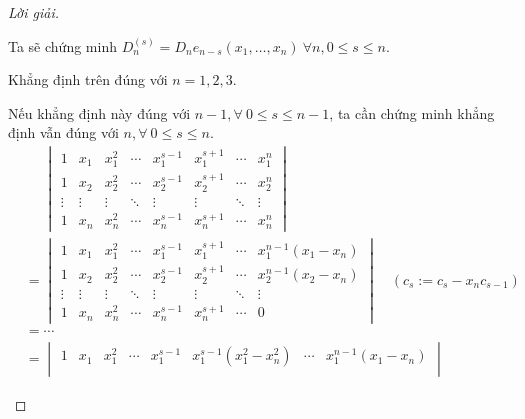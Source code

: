 \documentclass[class=linearalgebra,crop=false]{standalone}
\begin{document}
\begin{proof}[Lời giải]
\begin{enumerate}[label = (\alph*)]
              \par Ta sẽ chứng minh $D_{n}^{(s)} = D_{n}e_{n-s}(x_{1},\ldots, x_{n})\ \forall n, 0\le s\le n$.
              \par Khẳng định trên đúng với $n = 1, 2, 3$.
              \par Nếu khẳng định này đúng với $n - 1, \forall\ 0\le s\le n-1$, ta cần chứng minh khẳng định vẫn đúng với $n, \forall\ 0\le s\le n$.
              \begin{align*}
                   & \phantom{=}\begin{vmatrix}
                                    1      & x_{1}  & x_{1}^{2} & \cdots & x_{1}^{s-1} & x_{1}^{s+1} & \cdots & x_{1}^{n} \\
                                    1      & x_{2}  & x_{2}^{2} & \cdots & x_{2}^{s-1} & x_{2}^{s+1} & \cdots & x_{2}^{n} \\
                                    \vdots & \vdots & \vdots    & \ddots & \vdots      & \vdots      & \ddots & \vdots    \\
                                    1      & x_{n}  & x_{n}^{2} & \cdots & x_{n}^{s-1} & x_{n}^{s+1} & \cdots & x_{n}^{n}
                                \end{vmatrix}                                          \\
                   & =
                  \begin{vmatrix}
                      1      & x_{1}  & x_{1}^{2} & \cdots & x_{1}^{s-1} & x_{1}^{s+1} & \cdots & x_{1}^{n-1}(x_{1} - x_{n}) \\
                      1      & x_{2}  & x_{2}^{2} & \cdots & x_{2}^{s-1} & x_{2}^{s+1} & \cdots & x_{2}^{n-1}(x_{2} - x_{n}) \\
                      \vdots & \vdots & \vdots    & \ddots & \vdots      & \vdots      & \ddots & \vdots                     \\
                      1      & x_{n}  & x_{n}^{2} & \cdots & x_{n}^{s-1} & x_{n}^{s+1} & \cdots & 0
                  \end{vmatrix}\quad(c_{s}:=c_{s} - x_{n}c_{s-1})                                       \\
                   & = \cdots                                                                                                                                  \\
                   & =
                  \begin{vmatrix}
                      1      & x_{1}  & x_{1}^{2} & \cdots & x_{1}^{s-1} & x_{1}^{s-1}(x_{1}^{2} - x_{n}^{2}) & \cdots & x_{1}^{n-1}(x_{1} - x_{n}) \\

\end{vmatrix}
\end{align*}
\end{enumerate}
\end{proof}
\end{document}
